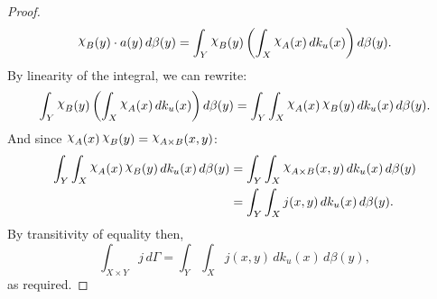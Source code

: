 \documentclass[
twoside=true,
paper=letter,
fontsize=9pt,
pagesize=auto,
leqno,
openany,
headsepline,
overfullrule,
]{scrbook}
\theoremstyle{plain}
\theoremstyle{plain}
\theoremstyle{definition}
\theoremstyle{bfnoteitalic}
\theoremstyle{bfnoteroman}
\newcommand{\charfunction}[1]{\mathop{{\raisebox{2pt}{$\chi$}}_{#1}}}
\newcommand{\funcj}{j}
\newcommand{\funck}{k}
\newcommand{\measurespace}{X}
\newcommand{\measurespaceii}{Y}
\newcommand{\mspaceelt}{x}
\newcommand{\mspaceeltii}{y}
\newcommand{\seti}{A}
\newcommand{\setii}{B}
\newcommand{\uspaceelt}{u}
\newcommand{\measonprod}{\Gamma}%
\newcommand{\marginaltwo}{\beta}%
\begin{document}
\begin{proof}
\[\charfunction{\setii}(\mspaceeltii)
\cdot
a(\mspaceeltii)\, d\marginaltwo(\mspaceeltii)
=
\int_\measurespaceii
\charfunction{\setii}(\mspaceeltii)
\left(\int_\measurespace
\charfunction{\seti} (\mspaceelt)
\, d\funck_\uspaceelt (\mspaceelt)\right)
   d\marginaltwo (\mspaceeltii).
\]
By linearity of the integral, we can rewrite:
\[
\int_\measurespaceii
\charfunction{\setii}(\mspaceeltii)
\left(\int_\measurespace
\charfunction{\seti} (\mspaceelt)
\, d\funck_\uspaceelt (\mspaceelt)\right)
   d\marginaltwo (\mspaceeltii)
=
\int_\measurespaceii
\int_\measurespace
\charfunction{\seti} (\mspaceelt)
\charfunction{\setii}(\mspaceeltii)
\, d\funck_\uspaceelt (\mspaceelt)
\, d\marginaltwo (\mspaceeltii).
\]
And since
$\charfunction{\seti} (\mspaceelt)
\charfunction{\setii}(\mspaceeltii)
=
\charfunction{\seti\times\setii}(\mspaceelt,\mspaceeltii)$:
\begin{align*}
\int_\measurespaceii
\int_\measurespace
\charfunction{\seti} (\mspaceelt)
\charfunction{\setii}(\mspaceeltii)
\, d\funck_\uspaceelt (\mspaceelt)
\, d\marginaltwo (\mspaceeltii)
& =
\int_\measurespaceii
\int_\measurespace
\charfunction{\seti\times\setii}
(\mspaceelt,\mspaceeltii)
\, d\funck_\uspaceelt (\mspaceelt)
\, d\marginaltwo (\mspaceeltii) \\
& =
\int_\measurespaceii
\int_\measurespace
\funcj (\mspaceelt,\mspaceeltii)
\, d\funck_\uspaceelt (\mspaceelt)
\, d\marginaltwo (\mspaceeltii).
\end{align*}
By transitivity of equality then,
\[
\int_{\measurespace\times\measurespaceii}
\funcj
\, d\measonprod
=
\int_\measurespaceii
\int_\measurespace
\funcj (\mspaceelt,\mspaceeltii)
\, d\funck_\uspaceelt (\mspaceelt)
\, d\marginaltwo (\mspaceeltii),
\]
as required.
\end{proof}
\end{document}
